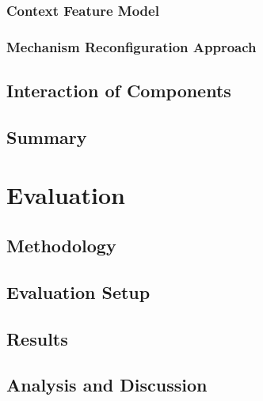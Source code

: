 \subsection{Context Feature Model}
\subsection{Mechanism Reconfiguration Approach}

\section{Interaction of Components}
\section{Summary}


\chapter{Evaluation}
\section{Methodology}

\section{Evaluation Setup}

\section{Results}
\section{Analysis and Discussion}


